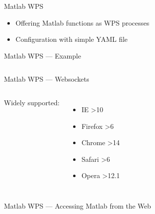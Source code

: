 \documentclass[xcolor=svgnames,professionalfonts,11pt,aspectratio=43,handout]{beamer}
\begin{document}

\begin{frame}[t]{Matlab WPS}
  \begin{itemize}
    \item Offering Matlab functions as WPS processes
    \item Configuration with simple YAML file
  \end{itemize}
\end{frame}

\begin{frame}[fragile]{Matlab WPS --- Example}
  \begin{columns}
    
    \pause
    
    \pause
    
  \end{columns}
\end{frame}

\begin{frame}[c,fragile]{Matlab WPS --- Websockets}
  \begin{columns}
    
    \pause
    
  \end{columns}
  \pause
  \begin{columns}
  Widely supported:
  \begin{itemize}
    \item IE \textgreater10
    \item Firefox \textgreater6
    \item Chrome \textgreater14
    \item Safari \textgreater6
    \item Opera \textgreater12.1
  \end{itemize}
  \end{columns}
\end{frame}

\begin{frame}[c,fragile]{Matlab WPS --- Accessing Matlab from the Web}
  \begin{columns}
    
    \pause
    
    \pause
    
  \end{columns}
\end{frame}
\end{document}
